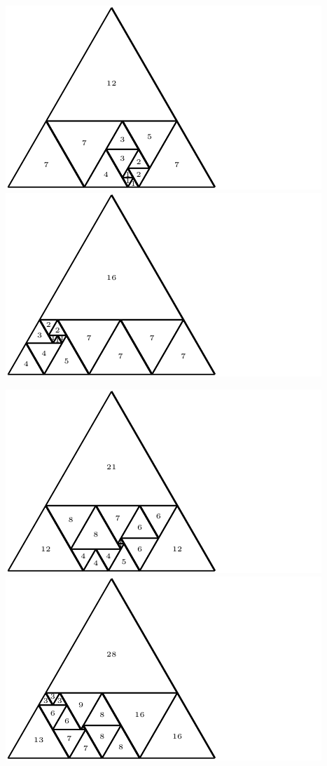 \documentclass[12pt,amstags,fleqn]{article}
\theoremstyle{plain}
\theoremstyle{definition}
\begin{document}
\begin{center}
\includegraphics{max_relative_size_13.pdf}\includegraphics{max_relative_size_14.pdf}
\end{center}
\begin{center}
\includegraphics{max_relative_size_15.pdf}\includegraphics{max_relative_size_16.pdf}
\end{center}
\end{document}

